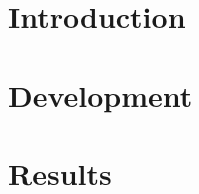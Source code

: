 \documentclass[
	12pt,				%
	openright,			%
	twoside,			%
	a4paper,			%
	english,			%
	french,				%
	spanish,			%
	brazil				%
	]{abntex2}
\begin{document}
\tableofcontents*
\cleardoublepage



\textual

\part{Introduction}




\part{Development}






\part{Results}






\postextual


\end{document}
